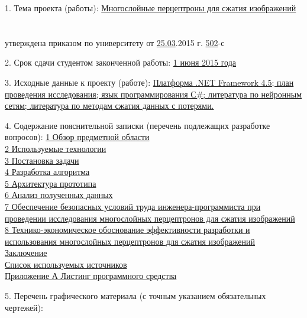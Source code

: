 {  1. Тема проекта (работы):
  \uline{Многослойные перцептроны для сжатия изображений}\lineunderscore\\
  \lineunderscore\\
  \lineunderscore\\
  утверждена приказом по университету от \uline{25.03}.2015 г.  \textnumero \uline{502}-с

  \vspace{1em}

  2. Срок сдачи студентом законченной работы: \uline{1 июня 2015 года}\lineunderscore

  \vspace{1em}

  3. Исходные данные к проекту (работе):
  \uline{Платформа .NET Framework 4.5; план проведения исследования; язык программирования С\#; литература по нейронным сетям; литература по методам сжатия данных с потерями.}\lineunderscore\\
  \lineunderscore

  \vspace{1em}

  4. Содержание пояснительной записки (перечень подлежащих разработке вопросов):
  \uline{1 Обзор предметной области}\lineunderscore\\
  \uline{2 Используемые технологии}\lineunderscore\\
  \uline{3 Постановка задачи}\lineunderscore\\
  \uline{4 Разработка алгоритма}\lineunderscore\\
  \uline{5 Архитектура прототипа}\lineunderscore\\
  \uline{6 Анализ полученных данных}\lineunderscore\\
  \uline{7 Обеспечение безопасных условий труда инженера-программиста при проведении исследования многослойных перцептронов для сжатия изображений}\lineunderscore\\
  \uline{8 Технико-экономическое обоснование эффективности разработки и использования многослойных перцептронов для сжатия изображений}\lineunderscore\\
  \uline{Заключение}\lineunderscore\\
  \uline{Список используемых источников}\lineunderscore\\
  \uline{Приложение А Листинг программного средства}\lineunderscore

  \clearpage
  \thispagestyle{empty}

  5. Перечень графического материала (с точным указанием обязательных чертежей):
  \lineunderscore\\
  \lineunderscore\\
  \lineunderscore\\
  \lineunderscore\\
  \lineunderscore\\
  \lineunderscore\\
  \lineunderscore\\
  \lineunderscore

}
